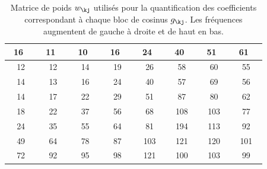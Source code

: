 \begin{table}
\footnotesize
\begin{center}
\begin{tabular}{| c | c | c | c | c | c | c | c |} \hline
\ 16\ \  &\ 11\ \ &\ 10\ \ &\ 16\ \ &\ 24\ \ &\ 40\ \ &\ 51\ \ &\ 61\
\ \\ \hline
 12 &  12 & 14 &  19 & 26 & 58&  60&  55\\ \hline
 14 & 13&  16&  24 & 40&  57&  69&  56  \\ \hline
 14 & 17 & 22&  29 &  51 & 87&  80 & 62\\ \hline
 18 & 22 & 37 & 56 & 68 & 108 & 103&  77\\ \hline
 24&  35 & 55&  64 & 81 & 194 & 113 & 92\\ \hline
 49 & 64 & 78&  87 & 103&  121&  120 & 101\\ \hline
 72&  92&  95 & 98 & 121&  100 & 103 & 99\\ \hline
\end{tabular}
\end{center}
\normalsize
\caption{Matrice de poids $w_\kj$ utilis\'es pour la
quantification des coefficients
correspondant \`a chaque bloc de cosinus
$g_\kj$. Les fr\'equences augmentent de gauche \`a droite et
de haut en bas.}
\label{TableOfWeights}
\end{table}
\\
\\
